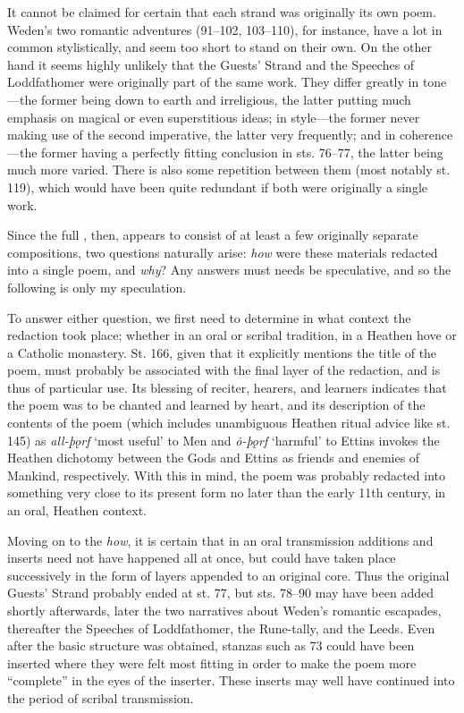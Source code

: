 It cannot be claimed for certain that each strand was originally its own poem.  Weden’s two romantic adventures (91–102, 103–110), for instance, have a lot in common stylistically, and seem too short to stand on their own.  On the other hand it seems highly unlikely that the Guests’ Strand and the Speeches of Loddfathomer were originally part of the same work.  They differ greatly in tone—the former being down to earth and irreligious, the latter putting much emphasis on magical or even superstitious ideas; in style—the former never making use of the second imperative, the latter very frequently; and in coherence—the former having a perfectly fitting conclusion in sts. 76–77, the latter being much more varied.  There is also some repetition between them (most notably st. 119), which would have been quite redundant if both were originally a single work.

Since the full \Havamal, then, appears to consist of at least a few originally separate compositions, two questions naturally arise: \emph{how} were these materials redacted into a single poem, and \emph{why}?  Any answers must needs be speculative, and so the following is only my speculation.

To answer either question, we first need to determine in what context the redaction took place; whether in an oral or scribal tradition, in a Heathen hove or a Catholic monastery.  St. 166, given that it explicitly mentions the title of the poem, must probably be associated with the final layer of the redaction, and is thus of particular use.  Its blessing of reciter, hearers, and learners indicates that the poem was to be chanted and learned by heart, and its description of the contents of the poem (which includes unambiguous Heathen ritual advice like st. 145) as \emph{all-þǫrf} ‘most useful’ to Men and \emph{ȯ-þǫrf} ‘harmful’ to Ettins invokes the Heathen dichotomy between the Gods and Ettins as friends and enemies of Mankind, respectively.  With this in mind, the poem was probably redacted into something very close to its present form no later than the early 11th century, in an oral, Heathen context.

Moving on to the \emph{how}, it is certain that in an oral transmission additions and inserts need not have happened all at once, but could have taken place successively in the form of layers appended to an original core.  Thus the original Guests’ Strand probably ended at st. 77, but sts. 78–90 may have been added shortly afterwards, later the two narratives about Weden’s romantic escapades, thereafter the Speeches of Loddfathomer, the Rune-tally, and the Leeds.  Even after the basic structure was obtained, stanzas such as 73 could have been inserted where they were felt most fitting in order to make the poem more “complete” in the eyes of the inserter.  These inserts may well have continued into the period of scribal transmission.

